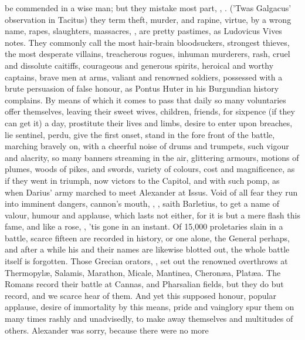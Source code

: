 {be commended in a wise man; but they mistake most part, , \etc{}. ('Twas
Galgacus' observation in Tacitus) they term theft, murder, and rapine,
virtue, by a wrong name, rapes, slaughters, massacres, \etc{} , are pretty pastimes, as Ludovicus Vives notes. They
commonly call the most hair-brain bloodsuckers, strongest thieves, the
most desperate villains, treacherous rogues, inhuman murderers, rash,
cruel and dissolute caitiffs, courageous and generous spirits, heroical
and worthy captains, brave men at arms, valiant and renowned
soldiers, possessed with a brute persuasion of false honour, as Pontus
Huter in his Burgundian history complains. By means of which it comes
to pass that daily so many voluntaries offer themselves, leaving their
sweet wives, children, friends, for sixpence (if they can get it) a
day, prostitute their lives and limbs, desire to enter upon breaches,
lie sentinel, perdu, give the first onset, stand in the fore front of
the battle, marching bravely on, with a cheerful noise of drums and
trumpets, such vigour and alacrity, so many banners streaming in the
air, glittering armours, motions of plumes, woods of pikes, and swords,
variety of colours, cost and magnificence, as if they went in triumph,
now victors to the Capitol, and with such pomp, as when Darius' army
marched to meet Alexander at Issus. Void of all fear they run into
imminent dangers, cannon's mouth, \etc{}, , saith Barletius, to get a name of valour, humour
and applause, which lasts not either, for it is but a mere flash this
fame, and like a rose, , 'tis gone in an
instant. Of 15,000 proletaries slain in a battle, scarce fifteen are
recorded in history, or one alone, the General perhaps, and after a
while his and their names are likewise blotted out, the whole battle
itself is forgotten. Those Grecian orators, , set out the renowned overthrows at Thermopyl\ae{}, Salamis,
Marathon, Micale, Mantinea, Cheron\ae{}a, Plat\ae{}a. The Romans record their
battle at Cannas, and Pharsalian fields, but they do but record, and we
scarce hear of them. And yet this supposed honour, popular applause,
desire of immortality by this means, pride and vainglory spur them on
many times rashly and unadvisedly, to make away themselves and
multitudes of others. Alexander was sorry, because there were no more
}
